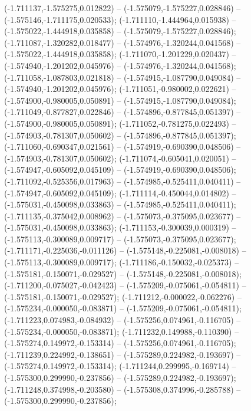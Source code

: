  (-1.711137,-1.575275,0.012822) -- (-1.575079,-1.575227,0.028846) -- (-1.575146,-1.711175,0.020533);
 (-1.711110,-1.444964,0.015938) -- (-1.575022,-1.444918,0.035858) -- (-1.575079,-1.575227,0.028846);
 (-1.711087,-1.320282,0.018477) -- (-1.574976,-1.320244,0.041568) -- (-1.575022,-1.444918,0.035858);
 (-1.711070,-1.201229,0.020437) -- (-1.574940,-1.201202,0.045976) -- (-1.574976,-1.320244,0.041568);
 (-1.711058,-1.087803,0.021818) -- (-1.574915,-1.087790,0.049084) -- (-1.574940,-1.201202,0.045976);
 (-1.711051,-0.980002,0.022621) -- (-1.574900,-0.980005,0.050891) -- (-1.574915,-1.087790,0.049084);
 (-1.711049,-0.877827,0.022846) -- (-1.574896,-0.877845,0.051397) -- (-1.574900,-0.980005,0.050891);
 (-1.711052,-0.781275,0.022493) -- (-1.574903,-0.781307,0.050602) -- (-1.574896,-0.877845,0.051397);
 (-1.711060,-0.690347,0.021561) -- (-1.574919,-0.690390,0.048506) -- (-1.574903,-0.781307,0.050602);
 (-1.711074,-0.605041,0.020051) -- (-1.574947,-0.605092,0.045109) -- (-1.574919,-0.690390,0.048506);
 (-1.711092,-0.525356,0.017963) -- (-1.574985,-0.525411,0.040411) -- (-1.574947,-0.605092,0.045109);
 (-1.711114,-0.450044,0.014802) -- (-1.575031,-0.450098,0.033863) -- (-1.574985,-0.525411,0.040411);
 (-1.711135,-0.375042,0.008962) -- (-1.575073,-0.375095,0.023677) -- (-1.575031,-0.450098,0.033863);
 (-1.711153,-0.300039,0.000319) -- (-1.575113,-0.300089,0.009717) -- (-1.575073,-0.375095,0.023677);
 (-1.711171,-0.225036,-0.011126) -- (-1.575148,-0.225081,-0.008018) -- (-1.575113,-0.300089,0.009717);
 (-1.711186,-0.150032,-0.025373) -- (-1.575181,-0.150071,-0.029527) -- (-1.575148,-0.225081,-0.008018);
 (-1.711200,-0.075027,-0.042423) -- (-1.575209,-0.075061,-0.054811) -- (-1.575181,-0.150071,-0.029527);
 (-1.711212,-0.000022,-0.062276) -- (-1.575234,-0.000050,-0.083871) -- (-1.575209,-0.075061,-0.054811);
 (-1.711223,0.074983,-0.084932) -- (-1.575256,0.074961,-0.116705) -- (-1.575234,-0.000050,-0.083871);
 (-1.711232,0.149988,-0.110390) -- (-1.575274,0.149972,-0.153314) -- (-1.575256,0.074961,-0.116705);
 (-1.711239,0.224992,-0.138651) -- (-1.575289,0.224982,-0.193697) -- (-1.575274,0.149972,-0.153314);
 (-1.711244,0.299995,-0.169714) -- (-1.575300,0.299990,-0.237856) -- (-1.575289,0.224982,-0.193697);
 (-1.711248,0.374998,-0.203580) -- (-1.575308,0.374996,-0.285788) -- (-1.575300,0.299990,-0.237856);
